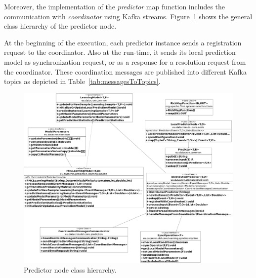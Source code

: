 \par Moreover, the implementation of the \textit{predictor} map function includes the communication  with \textit{coordinator} using Kafka streams.
Figure~\ref{fig:class_diagram} shows the general class hierarchy of the predictor node. %

 At the beginning of the execution,  each predictor instance sends a registration request to the coordinator. Also at the run-time,  it sends  its local prediction model as synchronization request,  or as a response for a resolution request from the coordinator. These coordination messages are published into different Kafka topics as depicted in Table~\ref{tab:messagesToTopics}. 
 
 
 \begin{figure}[H]
 	\centering
 	\includegraphics[width=\textwidth,height=\linewidth]{chapters/figures/predictor_diagram.png}
 	
 	\caption{Predictor node class hierarchy.}
 	\label{fig:class_diagram}
 \end{figure}

